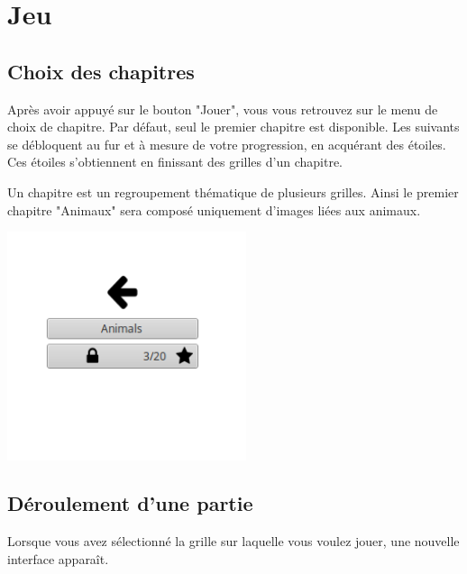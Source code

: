 \documentclass[a4paper, 12pt]{report}
\begin{document}
	\section{Jeu}

        \subsection{Choix des chapitres}
        
            Après avoir appuyé sur le bouton "Jouer", vous vous retrouvez sur le menu de choix de chapitre.
            Par défaut, seul le premier chapitre est disponible. Les suivants se débloquent au fur et à mesure de votre progression, en acquérant des étoiles. 
            Ces étoiles s'obtiennent en finissant des grilles d'un chapitre.
            
            Un chapitre est un regroupement thématique de plusieurs grilles. Ainsi le premier chapitre "Animaux" sera composé uniquement d'images liées aux animaux. 
            
            \begin{minipage}{\linewidth}
                    \centering
			        \includegraphics[width=7cm]{screenChoixChapitre.png}
	        \end{minipage}
            
        \subsection{Déroulement d'une partie}
        
            Lorsque vous avez sélectionné la grille sur laquelle vous voulez jouer, une nouvelle interface apparaît. 
            
\end{document}
